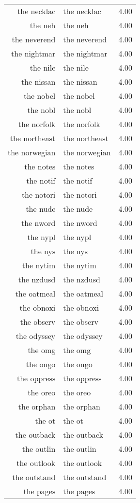 \begin{table}[ht]
\begin{tabular}{rlr}
  the necklac & the necklac & 4.00 \\ 
  the neh & the neh & 4.00 \\ 
  the neverend & the neverend & 4.00 \\ 
  the nightmar & the nightmar & 4.00 \\ 
  the nile & the nile & 4.00 \\ 
  the nissan & the nissan & 4.00 \\ 
  the nobel & the nobel & 4.00 \\ 
  the nobl & the nobl & 4.00 \\ 
  the norfolk & the norfolk & 4.00 \\ 
  the northeast & the northeast & 4.00 \\ 
  the norwegian & the norwegian & 4.00 \\ 
  the notes & the notes & 4.00 \\ 
  the notif & the notif & 4.00 \\ 
  the notori & the notori & 4.00 \\ 
  the nude & the nude & 4.00 \\ 
  the nword & the nword & 4.00 \\ 
  the nypl & the nypl & 4.00 \\ 
  the nys & the nys & 4.00 \\ 
  the nytim & the nytim & 4.00 \\ 
  the nzdusd & the nzdusd & 4.00 \\ 
  the oatmeal & the oatmeal & 4.00 \\ 
  the obnoxi & the obnoxi & 4.00 \\ 
  the observ & the observ & 4.00 \\ 
  the odyssey & the odyssey & 4.00 \\ 
  the omg & the omg & 4.00 \\ 
  the ongo & the ongo & 4.00 \\ 
  the oppress & the oppress & 4.00 \\ 
  the oreo & the oreo & 4.00 \\ 
  the orphan & the orphan & 4.00 \\ 
  the ot & the ot & 4.00 \\ 
  the outback & the outback & 4.00 \\ 
  the outlin & the outlin & 4.00 \\ 
  the outlook & the outlook & 4.00 \\ 
  the outstand & the outstand & 4.00 \\ 
  the pages & the pages & 4.00 \\ 

\end{tabular}
\end{table}
